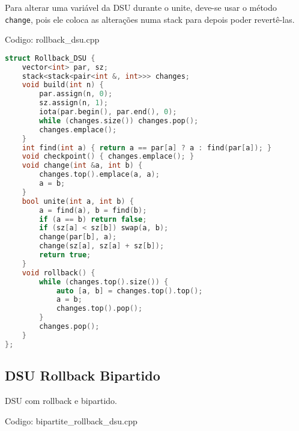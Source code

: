 \documentclass[10pt, a4paper, oneside]{book}
\begin{document}
Para alterar uma variável da DSU durante o unite, deve-se usar o método \texttt{change}, pois ele coloca as alterações numa stack para depois poder revertê-las.
\hfill

Codigo: rollback\_dsu.cpp

\begin{lstlisting}[language=C++]
struct Rollback_DSU {
    vector<int> par, sz;
    stack<stack<pair<int &, int>>> changes;
    void build(int n) {
        par.assign(n, 0);
        sz.assign(n, 1);
        iota(par.begin(), par.end(), 0);
        while (changes.size()) changes.pop();
        changes.emplace();
    }
    int find(int a) { return a == par[a] ? a : find(par[a]); }
    void checkpoint() { changes.emplace(); }
    void change(int &a, int b) {
        changes.top().emplace(a, a);
        a = b;
    }
    bool unite(int a, int b) {
        a = find(a), b = find(b);
        if (a == b) return false;
        if (sz[a] < sz[b]) swap(a, b);
        change(par[b], a);
        change(sz[a], sz[a] + sz[b]);
        return true;
    }
    void rollback() {
        while (changes.top().size()) {
            auto [a, b] = changes.top().top();
            a = b;
            changes.top().pop();
        }
        changes.pop();
    }
};\end{lstlisting}
\hfill

\subsection{DSU Rollback Bipartido}


DSU com rollback e bipartido.

\hfill

Codigo: bipartite\_rollback\_dsu.cpp
\end{document}
